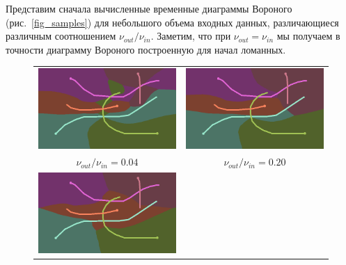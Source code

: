 \documentclass[12pt]{article}
\begin{document}
Представим сначала вычисленные временные диаграммы Вороного (рис.~\ref{fig_samples}) 
для небольшого объема входных данных, различающиеся различным 
соотношением $\nu_{out}/\nu_{in}$. Заметим, что при $\nu_{out} = \nu_{in}$ 
мы получаем в точности диаграмму Вороного построенную 
для начал ломанных.

\begin{figure}
\begin{center}
\begin{tabular}{c c}
\includegraphics[scale=0.2]{sample004.png} &
\includegraphics[scale=0.2]{sample020.png} \\
$\nu_{out} / \nu_{in} = 0.04$ & $\nu_{out} / \nu_{in} = 0.20$ \\
\includegraphics[scale=0.2]{sample050.png} &

\end{tabular}
\end{center}
\end{figure}
\end{document}

